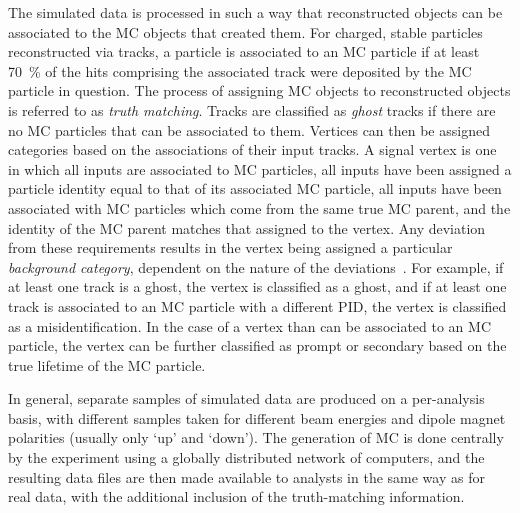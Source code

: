 The simulated data is processed in such a way that reconstructed objects can be 
associated to the \ac{MC} objects that created them.
For charged, stable particles reconstructed via tracks, a particle is 
associated to an \ac{MC} particle if at least \SI{70}{\percent} of the hits 
comprising the associated track were deposited by the \ac{MC} particle in 
question.
The process of assigning \ac{MC} objects to reconstructed objects is referred 
to as \emph{truth matching}.
Tracks are classified as \emph{ghost} tracks if there are no \ac{MC} particles 
that can be associated to them.
Vertices can then be assigned categories based on the associations of their 
input tracks.
A signal vertex is one in which all inputs are associated to \ac{MC} particles, 
all inputs have been assigned a particle identity equal to that of its 
associated \ac{MC} particle, all inputs have been associated with \ac{MC} 
particles which come from the same true \ac{MC} parent, and the identity of the 
\ac{MC} parent matches that assigned to the vertex.
Any deviation from these requirements results in the vertex being assigned a 
particular \emph{background category}, dependent on the nature of the 
deviations~\cite{Gligorov:1035682}.
For example, if at least one track is a ghost, the vertex is classified as a 
ghost, and if at least one track is associated to an \ac{MC} particle with a 
different \ac{PID}, the vertex is classified as a misidentification.
In the case of a vertex than can be associated to an \ac{MC} particle, the 
vertex can be further classified as prompt or secondary based on the true 
lifetime of the \ac{MC} particle.

In general, separate samples of simulated data are produced on a per-analysis 
basis, with different samples taken for different beam energies and dipole 
magnet polarities (usually only `up' and `down').
The generation of \ac{MC} is done centrally by the experiment using a globally 
distributed network of computers, and the resulting data files are then made 
available to analysts in the same way as for real data, with the additional 
inclusion of the truth-matching information.
